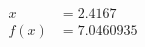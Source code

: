 \documentclass[preview]{standalone}
\begin{document}
\begin{align*}
x &= 2.4167\\f(x) &= 7.0460935
\end{align*}
\end{document}
